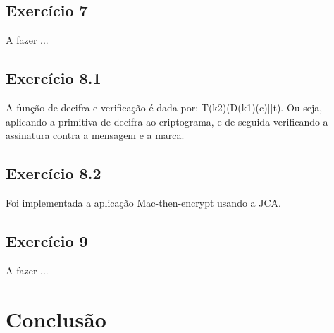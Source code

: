 \documentclass[11pt]{report}
\begin{document}
\subsection{Exercício 7}
A fazer ...\\

\subsection{Exercício 8.1}
A função de decifra e verificação é dada por: T(k2)(D(k1)(c)||t). Ou seja, aplicando a primitiva de decifra ao criptograma, e de seguida verificando a assinatura contra a mensagem e a marca.\\

\subsection{Exercício 8.2}
Foi implementada a aplicação Mac-then-encrypt usando a JCA.\\

\subsection{Exercício 9}
A fazer ... \\
\newpage



\section{Conclusão}
\end{document}
